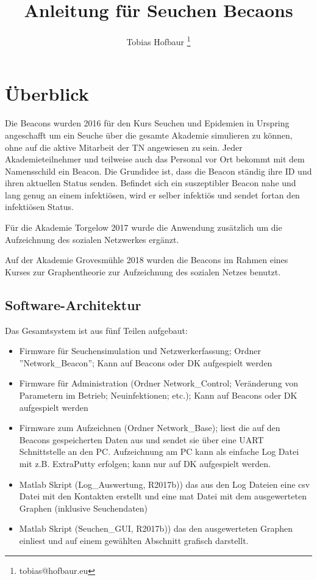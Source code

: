 \documentclass[11pt,ngerman]{scrartcl} %
\title{Anleitung für Seuchen Becaons}
\author{Tobias Hofbaur \footnote{tobias@hofbaur.eu}}
\begin{document}
\maketitle

\section{Überblick}
Die Beacons wurden 2016 für den Kurs Seuchen und Epidemien in Urspring angeschafft um ein Seuche über die gesamte Akademie simulieren zu können, ohne auf die aktive Mitarbeit der TN angewiesen zu sein. 
Jeder Akademieteilnehmer und teilweise auch das Personal vor Ort bekommt mit dem Namensschild ein Beacon. Die Grundidee ist, dass die Beacon ständig ihre ID und ihren aktuellen Status senden. Befindet sich ein suszeptibler Beacon nahe und lang genug an einem infektiösen, wird er selber infektiös und sendet fortan den infektiösen Status.

Für die Akademie Torgelow 2017 wurde die Anwendung zusätzlich um die Aufzeichnung des sozialen Netzwerkes ergänzt.

Auf der Akademie Grovesmühle 2018 wurden die Beacons im Rahmen eines Kurses zur Graphentheorie zur Aufzeichnung des sozialen Netzes benutzt.

\subsection{Software-Architektur}
Das Gesamtsystem ist aus fünf Teilen aufgebaut:
\begin{itemize}
\item Firmware  für Seuchensimulation und Netzwerkerfassung; Ordner ''Network\_Beacon''; Kann auf Beacons oder DK aufgespielt werden
\item Firmware für Administration (Ordner Network\_Control; Veränderung von Parametern im Betrieb; Neuinfektionen; etc.);  Kann auf Beacons oder DK aufgespielt werden
\item Firmware zum Aufzeichnen (Ordner Network\_Base); liest die auf den Beacons gespeicherten Daten aus und sendet sie über eine UART Schnittstelle an den PC. Aufzeichnung am PC kann als einfache Log Datei mit z.B. ExtraPutty erfolgen; kann nur auf DK aufgespielt werden.
\item  Matlab Skript (Log\_Auswertung, R2017b)) das aus den Log Dateien eine csv Datei mit den Kontakten erstellt und eine mat Datei mit dem ausgewerteten Graphen (inklusive Seuchendaten)
\item  Matlab Skript (Seuchen\_GUI, R2017b)) das den ausgewerteten Graphen einliest und auf einem gewählten Abschnitt grafisch darstellt.
\end{itemize}
\end{document}
